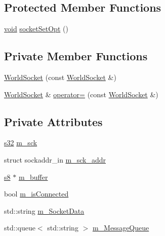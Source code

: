 \subsection*{Protected Member Functions}
\begin{DoxyCompactItemize}
\item 
\mbox{\hyperlink{_thread_8h_af1e856da2e658414cb2456cb6f7ebc66}{void}} \mbox{\hyperlink{classnjli_1_1_world_socket_ae15dc1f2db17e7ef5faccc4e6ad335e9}{socket\+Set\+Opt}} ()
\end{DoxyCompactItemize}
\subsection*{Private Member Functions}
\begin{DoxyCompactItemize}
\item 
\mbox{\hyperlink{classnjli_1_1_world_socket_a6c5aa4b415b1260606c4c81f2aad03e6}{World\+Socket}} (const \mbox{\hyperlink{classnjli_1_1_world_socket}{World\+Socket}} \&)
\item 
\mbox{\hyperlink{classnjli_1_1_world_socket}{World\+Socket}} \& \mbox{\hyperlink{classnjli_1_1_world_socket_a1a085ac09dc8bd9504fa4c03b1f4d86d}{operator=}} (const \mbox{\hyperlink{classnjli_1_1_world_socket}{World\+Socket}} \&)
\end{DoxyCompactItemize}
\subsection*{Private Attributes}
\begin{DoxyCompactItemize}
\item 
\mbox{\hyperlink{_util_8h_aa62c75d314a0d1f37f79c4b73b2292e2}{s32}} \mbox{\hyperlink{classnjli_1_1_world_socket_a6535269e736f06ed9464a85e1ee94ad5}{m\+\_\+sck}}
\item 
struct sockaddr\+\_\+in \mbox{\hyperlink{classnjli_1_1_world_socket_ab8eaf650ed60181c5984c50190967952}{m\+\_\+sck\+\_\+addr}}
\item 
\mbox{\hyperlink{_util_8h_a2ff401e087cf786c38a6812723e94473}{s8}} $\ast$ \mbox{\hyperlink{classnjli_1_1_world_socket_a20a56b50c5086151d1ceb67034ae4cd1}{m\+\_\+buffer}}
\item 
bool \mbox{\hyperlink{classnjli_1_1_world_socket_afc58ced137ddce637734bb7b67a8accb}{m\+\_\+is\+Connected}}
\item 
std\+::string \mbox{\hyperlink{classnjli_1_1_world_socket_ad139dd74c61b2663bfb08861cc51f1b5}{m\+\_\+\+Socket\+Data}}
\item 
std\+::queue$<$ std\+::string $>$ \mbox{\hyperlink{classnjli_1_1_world_socket_adb76e0e0966e72716f105875633a727a}{m\+\_\+\+Message\+Queue}}
\end{DoxyCompactItemize}



